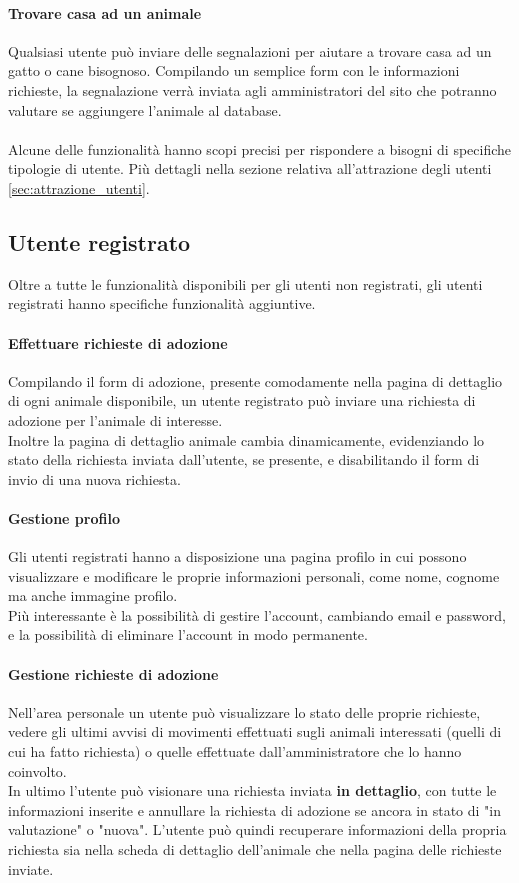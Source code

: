 \paragraph{Trovare casa ad un animale}
Qualsiasi utente può inviare delle segnalazioni per aiutare a trovare casa ad un gatto o cane bisognoso. Compilando un semplice form con le informazioni richieste, la segnalazione verrà inviata agli amministratori del sito che potranno valutare se aggiungere l'animale al database.\\\\
Alcune delle funzionalità hanno scopi precisi per rispondere a bisogni di specifiche tipologie di utente. Più dettagli nella sezione relativa all'attrazione degli utenti \ref{sec:attrazione_utenti}.
\subsection{Utente registrato}
Oltre a tutte le funzionalità disponibili per gli utenti non registrati, gli utenti registrati hanno specifiche funzionalità aggiuntive.
\paragraph{Effettuare richieste di adozione}
Compilando il form di adozione, presente comodamente nella pagina di dettaglio di ogni animale disponibile, un utente registrato può inviare una richiesta di adozione per l'animale di interesse.\\
Inoltre la pagina di dettaglio animale cambia dinamicamente, evidenziando lo stato della richiesta inviata dall'utente, se presente, e disabilitando il form di invio di una nuova richiesta.
\paragraph{Gestione profilo}
Gli utenti registrati hanno a disposizione una pagina profilo in cui possono visualizzare e modificare le proprie informazioni personali, come nome, cognome ma anche immagine profilo.\\
Più interessante è la possibilità di gestire l'account, cambiando email e password, e la possibilità di eliminare l'account in modo permanente.
\paragraph{Gestione richieste di adozione}
Nell'area personale un utente può visualizzare lo stato delle proprie richieste, vedere gli ultimi avvisi di movimenti effettuati sugli animali interessati (quelli di cui ha fatto richiesta) o quelle effettuate dall'amministratore che lo hanno coinvolto.\\ 
In ultimo l'utente può visionare una richiesta inviata \textbf{in dettaglio}, con tutte le informazioni inserite e annullare la richiesta di adozione se ancora in stato di "in valutazione" o "nuova". L'utente può quindi recuperare informazioni della propria richiesta sia nella scheda di dettaglio dell'animale che nella pagina delle richieste inviate.
